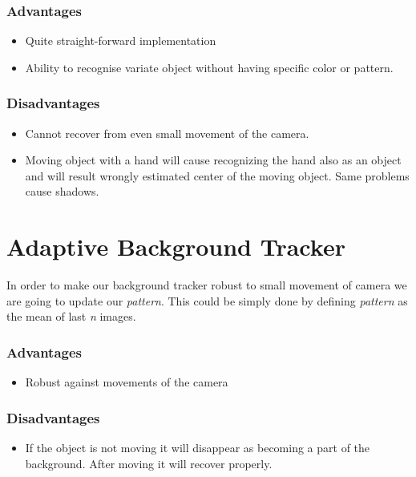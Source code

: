 \subsubsection{Advantages}
\begin{itemize}
\item Quite straight-forward implementation
\item Ability to recognise variate object without having specific color or pattern.
\end{itemize}

\subsubsection{Disadvantages}
\begin{itemize}
\item Cannot recover from even small movement of the camera.
\item Moving object with a hand will cause recognizing the hand also as an object and will result wrongly estimated center of the moving object. Same problems cause shadows.
\end{itemize}


\section{Adaptive Background Tracker}

In order to make our background tracker robust to small movement of camera we
are going to update our \emph{pattern}. This could be simply done by defining \emph{pattern}
as the mean of last \emph{n} images.

\subsubsection{Advantages}
\begin{itemize}
\item Robust against movements of the camera
\end{itemize}

\subsubsection{Disadvantages}
\begin{itemize}
\item If the object is not moving it will disappear as becoming a part of the
background. After moving it will recover properly.
\end{itemize}


